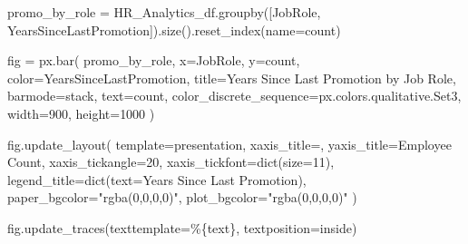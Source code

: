 \documentclass[
  letterpaper,
  DIV=11,
  numbers=noendperiod]{scrartcl}
\newenvironment{Shaded}{\begin{snugshade}}{\end{snugshade}}
\newcommand{\BuiltInTok}[1]{\textcolor[rgb]{0.00,0.23,0.31}{#1}}
\newcommand{\DecValTok}[1]{\textcolor[rgb]{0.68,0.00,0.00}{#1}}
\newcommand{\NormalTok}[1]{\textcolor[rgb]{0.00,0.23,0.31}{#1}}
\newcommand{\OperatorTok}[1]{\textcolor[rgb]{0.37,0.37,0.37}{#1}}
\newcommand{\SpecialCharTok}[1]{\textcolor[rgb]{0.37,0.37,0.37}{#1}}
\newcommand{\StringTok}[1]{\textcolor[rgb]{0.13,0.47,0.30}{#1}}
\begin{document}
\begin{Shaded}
\begin{Highlighting}[]
\NormalTok{promo\_by\_role }\OperatorTok{=}\NormalTok{ HR\_Analytics\_df.groupby([}\StringTok{\textquotesingle{}JobRole\textquotesingle{}}\NormalTok{, }\StringTok{\textquotesingle{}YearsSinceLastPromotion\textquotesingle{}}\NormalTok{]).size().reset\_index(name}\OperatorTok{=}\StringTok{\textquotesingle{}count\textquotesingle{}}\NormalTok{)}

\NormalTok{fig }\OperatorTok{=}\NormalTok{ px.bar(}
\NormalTok{    promo\_by\_role,}
\NormalTok{    x}\OperatorTok{=}\StringTok{\textquotesingle{}JobRole\textquotesingle{}}\NormalTok{,}
\NormalTok{    y}\OperatorTok{=}\StringTok{\textquotesingle{}count\textquotesingle{}}\NormalTok{,}
\NormalTok{    color}\OperatorTok{=}\StringTok{\textquotesingle{}YearsSinceLastPromotion\textquotesingle{}}\NormalTok{,}
\NormalTok{    title}\OperatorTok{=}\StringTok{\textquotesingle{}Years Since Last Promotion by Job Role\textquotesingle{}}\NormalTok{,}
\NormalTok{    barmode}\OperatorTok{=}\StringTok{\textquotesingle{}stack\textquotesingle{}}\NormalTok{,}
\NormalTok{    text}\OperatorTok{=}\StringTok{\textquotesingle{}count\textquotesingle{}}\NormalTok{,}
\NormalTok{    color\_discrete\_sequence}\OperatorTok{=}\NormalTok{px.colors.qualitative.Set3,}
\NormalTok{    width}\OperatorTok{=}\DecValTok{900}\NormalTok{,   }
\NormalTok{    height}\OperatorTok{=}\DecValTok{1000}  
\NormalTok{)}

\NormalTok{fig.update\_layout(}
\NormalTok{    template}\OperatorTok{=}\StringTok{\textquotesingle{}presentation\textquotesingle{}}\NormalTok{,}
\NormalTok{    xaxis\_title}\OperatorTok{=}\StringTok{\textquotesingle{}\textquotesingle{}}\NormalTok{,  }
\NormalTok{    yaxis\_title}\OperatorTok{=}\StringTok{\textquotesingle{}Employee Count\textquotesingle{}}\NormalTok{,}
\NormalTok{    xaxis\_tickangle}\OperatorTok{=}\DecValTok{20}\NormalTok{,           }
\NormalTok{    xaxis\_tickfont}\OperatorTok{=}\BuiltInTok{dict}\NormalTok{(size}\OperatorTok{=}\DecValTok{11}\NormalTok{), }
\NormalTok{    legend\_title}\OperatorTok{=}\BuiltInTok{dict}\NormalTok{(text}\OperatorTok{=}\StringTok{\textquotesingle{}Years Since Last Promotion\textquotesingle{}}\NormalTok{),}
\NormalTok{    paper\_bgcolor}\OperatorTok{=}\StringTok{"rgba(0,0,0,0)"}\NormalTok{,}
\NormalTok{    plot\_bgcolor}\OperatorTok{=}\StringTok{"rgba(0,0,0,0)"}
\NormalTok{)}

\NormalTok{fig.update\_traces(texttemplate}\OperatorTok{=}\StringTok{\textquotesingle{}\%}\SpecialCharTok{\{text\}}\StringTok{\textquotesingle{}}\NormalTok{, textposition}\OperatorTok{=}\StringTok{\textquotesingle{}inside\textquotesingle{}}\NormalTok{)}


\end{Highlighting}
\end{Shaded}
\end{document}
